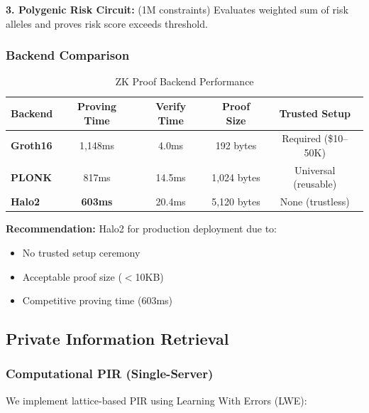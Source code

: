 \documentclass[11pt,letterpaper]{article}
\begin{document}
\textbf{3. Polygenic Risk Circuit:} (1M constraints) Evaluates weighted sum of risk alleles and proves risk score exceeds threshold.

\subsubsection{Backend Comparison}

\begin{table}[!ht]
\centering
\caption{ZK Proof Backend Performance}
\begin{tabular}{lcccc}
\toprule
\textbf{Backend} & \textbf{Proving Time} & \textbf{Verify Time} & \textbf{Proof Size} & \textbf{Trusted Setup} \\
\midrule
\textbf{Groth16} & 1,148ms & 4.0ms & 192 bytes & Required (\$10--50K) \\
\textbf{PLONK} & 817ms & 14.5ms & 1,024 bytes & Universal (reusable) \\
\textbf{Halo2} & \textbf{603ms} & 20.4ms & 5,120 bytes & None (trustless) \\
\bottomrule
\end{tabular}
\end{table}

\textbf{Recommendation:} Halo2 for production deployment due to:
\begin{itemize}
\item No trusted setup ceremony
\item Acceptable proof size ($<$10KB)
\item Competitive proving time (603ms)
\end{itemize}

\subsection{Private Information Retrieval}

\subsubsection{Computational PIR (Single-Server)}

We implement lattice-based PIR using Learning With Errors (LWE):
\end{document}
